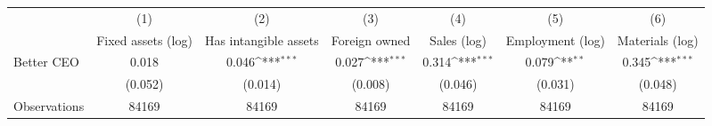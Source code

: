 {
\def\sym#1{\ifmmode^{#1}\else\(^{#1}\)\fi}
\begin{tabular}{l*{6}{c}}
\hline\hline
                    &\multicolumn{1}{c}{(1)}&\multicolumn{1}{c}{(2)}&\multicolumn{1}{c}{(3)}&\multicolumn{1}{c}{(4)}&\multicolumn{1}{c}{(5)}&\multicolumn{1}{c}{(6)}\\
                    &\multicolumn{1}{c}{Fixed assets (log)}&\multicolumn{1}{c}{Has intangible assets}&\multicolumn{1}{c}{Foreign owned}&\multicolumn{1}{c}{Sales (log)}&\multicolumn{1}{c}{Employment (log)}&\multicolumn{1}{c}{Materials (log)}\\
\hline
Better CEO          &       0.018         &       0.046\sym{***}&       0.027\sym{***}&       0.314\sym{***}&       0.079\sym{**} &       0.345\sym{***}\\
                    &     (0.052)         &     (0.014)         &     (0.008)         &     (0.046)         &     (0.031)         &     (0.048)         \\
\hline
Observations        &       84169         &       84169         &       84169         &       84169         &       84169         &       84169         \\
\hline\hline
\end{tabular}
}
